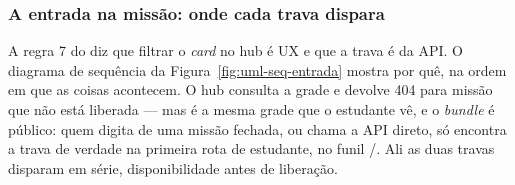 \subsubsection{A entrada na missão: onde cada trava dispara}

A regra 7 do  diz que filtrar o \emph{card} no hub é UX e que a
trava é da API. O diagrama de sequência da Figura~\ref{fig:uml-seq-entrada} mostra
por quê, na ordem em que as coisas acontecem. O hub consulta a grade e devolve 404
para missão que não está liberada --- mas é a mesma grade que o estudante vê, e o
\emph{bundle} é público: quem digita  de uma missão fechada, ou
chama a API direto, só encontra a trava de verdade na primeira rota de estudante,
no funil /. Ali as duas travas disparam
em série, disponibilidade antes de liberação.

